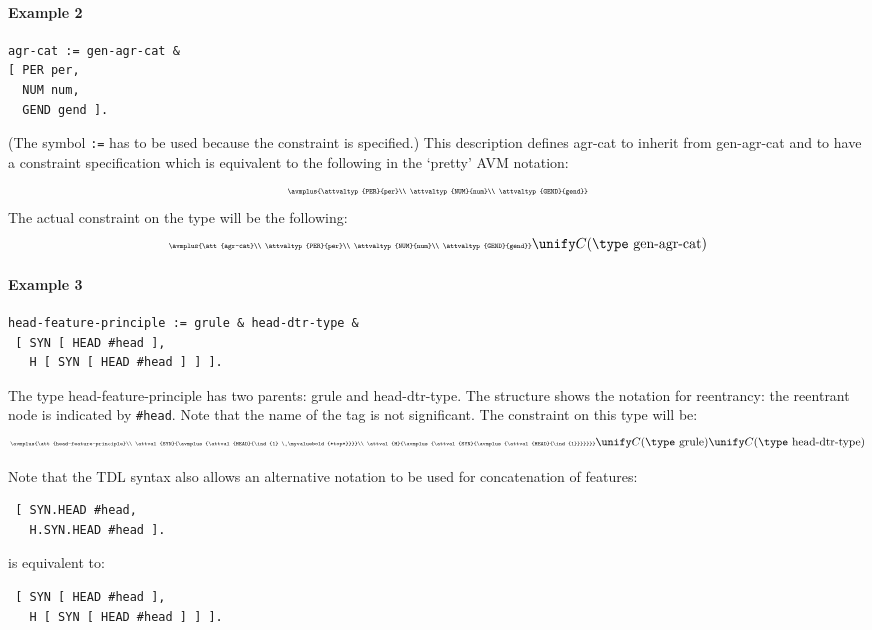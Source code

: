 \documentclass[12pt]{report}
\begin{document}
\paragraph{Example 2}

\begin{verbatim}
agr-cat := gen-agr-cat &
[ PER per,
  NUM num,
  GEND gend ].
\end{verbatim}
(The symbol \verb+:=+ has to be used because the
constraint is specified.)
This description
defines {\type agr-cat} to inherit from {\type gen-agr-cat} and to
have a constraint specification which is equivalent to the
following in the `pretty' AVM notation:
\[
\mbox{\tiny
   $\avmplus{\attvaltyp{PER}{per}\\
             \attvaltyp{NUM}{num}\\
             \attvaltyp{GEND}{gend}}$}
\]
The actual constraint on the type will be the following:
\[
\mbox{\tiny
   $\avmplus{\att{agr-cat}\\
             \attvaltyp{PER}{per}\\
             \attvaltyp{NUM}{num}\\
             \attvaltyp{GEND}{gend}}$} \unify
C(\mbox{\type gen-agr-cat})
\]


\paragraph{Example 3}

\begin{verbatim}
head-feature-principle := grule & head-dtr-type & 
 [ SYN [ HEAD #head ],
   H [ SYN [ HEAD #head ] ] ].
\end{verbatim}
The type {\type head-feature-principle}
has two parents: {\type grule} and {\type head-dtr-type}. 
The structure shows the notation for reentrancy: the
reentrant node is indicated by \verb+#head+.  Note that
the name of the tag is not significant.  
The constraint on this type will be:
\[
\mbox{\tiny
   $\avmplus{\att{head-feature-principle}\\
             \attval{SYN}{\avmplus
                           {\attval{HEAD}{\ind{1} \ \myvaluebold{*top*}}}}\\
             \attval{H}{\avmplus{\attval{SYN}{\avmplus
                                              {\attval{HEAD}{\ind{1}}}}}}}$}
\unify
C(\mbox{\type  grule}) \unify
C(\mbox{\type head-dtr-type})
\]

Note that the TDL syntax also allows an alternative notation to be used
for concatenation of features:
\begin{verbatim}
 [ SYN.HEAD #head,
   H.SYN.HEAD #head ].
\end{verbatim}
is equivalent to:
\begin{verbatim}
 [ SYN [ HEAD #head ],
   H [ SYN [ HEAD #head ] ] ].
\end{verbatim}
\end{document}
